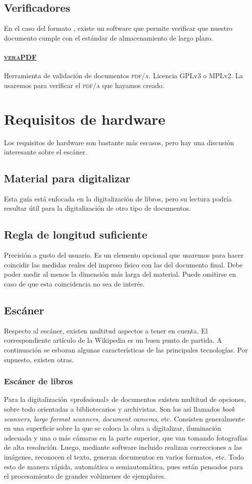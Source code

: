 \documentclass[%
	a5paper,
	10pt,
	twoside,
	openright,
	final,
]{memoir}
\begin{document}
	\subsection{Verificadores} En el caso del formato \pdf, existe un software que permite verificar que nuestro documento cumple con el estándar \pdfa de almacenamiento de largo plazo.
	\paragraph{\href{https://verapdf.org}{\textsc{veraPDF}}} Herramienta de validación de documentos \textsc{pdf/a}. Licencia GPLv3 o MPLv2. La usaremos para verificar el \textsc{pdf/a} que hayamos creado.

	\section{Requisitos de hardware} Los requisitos de hardware son bastante más escasos, pero hay una discusión interesante sobre el escáner.
	\subsection{Material para digitalizar} Esta guía está enfocada en la digitalización de libros, pero su lectura podría resultar útil para la digitalización de otro tipo de documentos.
	\subsection{Regla de longitud suficiente} Precisión a gusto del usuario. Es un elemento opcional que usaremos para hacer coincidir las medidas reales del impreso físico con las del documento final. Debe poder medir al menos la dimensión más larga del material. Puede omitirse en caso de que esta coincidencia no sea de interés.
	\subsection{Escáner} Respecto al escáner, existen multitud aspectos a tener en cuenta. El correspondiente artículo de la Wikipedia \cite{WikipediaImageScanner} es un buen punto de partida. A continuación se esbozan algunas características de las principales tecnologías. Por supuesto, existen otras.
	\subsubsection{Escáner de libros} Para la digitalización «profesional» de documentos existen multitud de opciones, sobre todo orientadas a bibliotecarios y archivistas. Son los así llamados \emph{book scanners}, \emph{large format scanners}, \emph{document cameras}, etc. Consisten generalmente en una superficie sobre la que se coloca la obra a digitalizar, iluminación adecuada y una o más cámaras en la parte superior, que van tomando fotografías de alta resolución. Luego, mediante software incluido realizan correcciones a las imágenes, reconocen el texto, generan documentos en varios formatos, etc. Todo esto de manera rápida, automática o semiautomática, pues están pensados para el procesamiento de grandes volúmenes de ejemplares.
\end{document}
